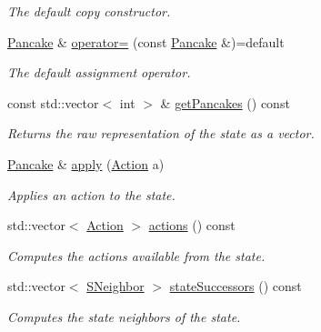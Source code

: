 \begin{DoxyCompactItemize}
\begin{DoxyCompactList}\small\item\em The default copy constructor. \end{DoxyCompactList}\item 
\hyperlink{structdomain_1_1pancake_1_1Pancake}{Pancake} \& \hyperlink{structdomain_1_1pancake_1_1Pancake_ac348c426e2256ef3651954e0efdcd5ea}{operator=} (const \hyperlink{structdomain_1_1pancake_1_1Pancake}{Pancake} \&)=default
\begin{DoxyCompactList}\small\item\em The default assignment operator. \end{DoxyCompactList}\item 
const std\+::vector$<$ int $>$ \& \hyperlink{structdomain_1_1pancake_1_1Pancake_a6b06daff688b8fde3b203cb5af9962c1}{get\+Pancakes} () const 
\begin{DoxyCompactList}\small\item\em Returns the raw representation of the state as a vector. \end{DoxyCompactList}\item 
\hyperlink{structdomain_1_1pancake_1_1Pancake}{Pancake} \& \hyperlink{structdomain_1_1pancake_1_1Pancake_aa7e4c0977dcb50e7565093fa36934488}{apply} (\hyperlink{structdomain_1_1pancake_1_1Pancake_a58ceacb6a181cbcdb34169b300957f95}{Action} a)
\begin{DoxyCompactList}\small\item\em Applies an action to the state. \end{DoxyCompactList}\item 
std\+::vector$<$ \hyperlink{structdomain_1_1pancake_1_1Pancake_a58ceacb6a181cbcdb34169b300957f95}{Action} $>$ \hyperlink{structdomain_1_1pancake_1_1Pancake_a187e2cba39d1268d9e50851aa91daa6d}{actions} () const 
\begin{DoxyCompactList}\small\item\em Computes the actions available from the state. \end{DoxyCompactList}\item 
std\+::vector$<$ \hyperlink{structdomain_1_1pancake_1_1Pancake_af7820a082306e9c40299c58164e6a712}{S\+Neighbor} $>$ \hyperlink{structdomain_1_1pancake_1_1Pancake_aa1f8a9ba48d02700f5facf91359f4d31}{state\+Successors} () const 
\begin{DoxyCompactList}\small\item\em Computes the state neighbors of the state. \end{DoxyCompactList}\item 

\end{DoxyCompactItemize}
